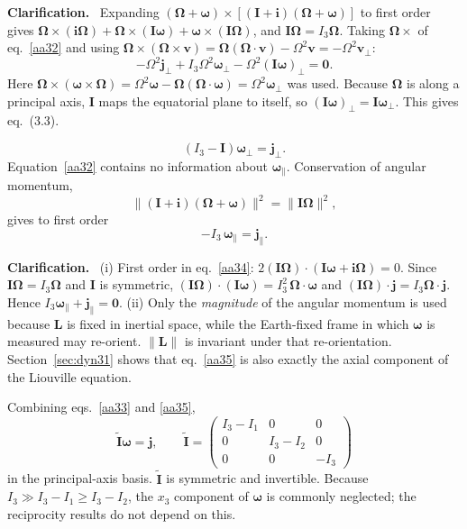 \documentclass[11pt,a4paper]{article}
\newcommand{\bO}{\bm{\Omega}}
\newcommand{\bw}{\bm{\omega}}
\newcommand{\bj}{\mathbf{j}}
\newcommand{\bI}{\mathbf{I}}
\newcommand{\bi}{\mathbf{i}}
\newcommand{\It}{\tilde{\mathbf{I}}}
\renewenvironment{leftbar}{%
  \def\FrameCommand{{\color{clarbar}\vrule width 2.5pt}\hspace{8pt}}%
  \MakeFramed{\advance\hsize-\width\FrameRestore}}%
  {\endMakeFramed}
\newenvironment{clar}{\begin{leftbar}\small\noindent\textbf{Clarification.}\ }{\end{leftbar}}
\begin{document}
\begin{clar}
Expanding $(\bO+\bw)\times[(\bI+\bi)(\bO+\bw)]$ to first order gives
$\bO\times(\bi\bO)+\bO\times(\bI\bw)+\bw\times(\bI\bO)$, and $\bI\bO=I_3\bO$. Taking
$\bO\times$ of eq.~\eqref{aa32} and using $\bO\times(\bO\times\mathbf{v})=\bO(\bO\cdot\mathbf{v})-\Omega^2\mathbf{v}=-\Omega^2\mathbf{v}_\perp$:
\begin{equation}
  -\Omega^2\bj_\perp+I_3\Omega^2\bw_\perp-\Omega^2(\bI\bw)_\perp=\mathbf{0}.
  \tag{3.2a}\label{aa32a}
\end{equation}
Here $\bO\times(\bw\times\bO)=\Omega^2\bw-\bO(\bO\cdot\bw)=\Omega^2\bw_\perp$ was used. Because
$\bO$ is along a principal axis, $\bI$ maps the equatorial plane to itself, so
$(\bI\bw)_\perp=\bI\bw_\perp$. This gives eq.~(3.3).
\end{clar}

\begin{equation}
  (I_3-\bI)\bw_\perp=\bj_\perp .
  \tag{3.3}\label{aa33}
\end{equation}
Equation~\eqref{aa32} contains no information about $\bw_\parallel$. Conservation of angular momentum,
\begin{equation}
  \|(\bI+\bi)(\bO+\bw)\|^2=\|\bI\bO\|^2,
  \tag{3.4}\label{aa34}
\end{equation}
gives to first order
\begin{equation}
  -I_3\,\bw_\parallel=\bj_\parallel .
  \tag{3.5}\label{aa35}
\end{equation}

\begin{clar}
(i) First order in eq.~\eqref{aa34}: $2(\bI\bO)\cdot(\bI\bw+\bi\bO)=0$. Since $\bI\bO=I_3\bO$ and
$\bI$ is symmetric, $(\bI\bO)\cdot(\bI\bw)=I_3^2\,\bO\cdot\bw$ and $(\bI\bO)\cdot\bj=I_3\bO\cdot\bj$.
Hence $I_3\bw_\parallel+\bj_\parallel=\mathbf{0}$. (ii) Only the \emph{magnitude} of the angular
momentum is used because $\mathbf{L}$ is fixed in inertial space, while the Earth-fixed frame in
which $\bw$ is measured may re-orient. $\|\mathbf{L}\|$ is invariant under that re-orientation.
Section~\ref{sec:dyn31} shows that eq.~\eqref{aa35} is also exactly the axial component of the
Liouville equation.
\end{clar}

Combining eqs.~\eqref{aa33} and \eqref{aa35},
\begin{equation}
  \It\bw=\bj,\qquad
  \It=\begin{pmatrix}I_3-I_1&0&0\\0&I_3-I_2&0\\0&0&-I_3\end{pmatrix}
  \tag{3.6--3.7}\label{aa36}
\end{equation}
in the principal-axis basis. $\It$ is symmetric and invertible. Because
$I_3\gg I_3-I_1\ge I_3-I_2$, the $x_3$ component of $\bw$ is commonly neglected; the reciprocity
results do not depend on this.
\end{document}

